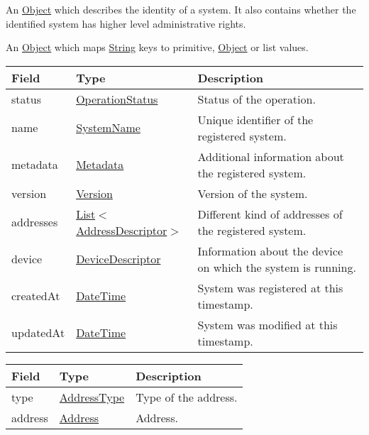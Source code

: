 \documentclass[a4paper]{arrowhead}
\newcommand{\pref}[1]{{\textcolor{ArrowheadGrey}{\hyperref[sec:model:primitives:#1]{#1}}}}
\begin{document}

An \pref{Object} which describes the identity of a system. It also contains whether the identified system has higher level administrative rights.


An \pref{Object} which maps \pref{String} keys to primitive, \pref{Object} or list values.

 
\begin{table}[ht!]
\begin{tabularx}{\textwidth}{| p{4.25cm} | p{4cm} | X |} \hline
\rowcolor{gray!33} Field & Type      & Description \\ \hline
status & \pref{OperationStatus} & Status of the operation. \\ \hline
name & \pref{SystemName} & Unique identifier of the registered system. \\ \hline
metadata & \hyperref[sec:model:Metadata]{Metadata} & Additional information about the registered system. \\ \hline
version & \pref{Version} & Version of the system. \\ \hline
addresses &  \pref{List}$<$\hyperref[sec:model:AddressDescriptor]{AddressDescriptor}$>$ & Different kind of addresses of the registered system.  \\ \hline
device & \hyperref[sec:model:DeviceDescriptor]{DeviceDescriptor} & Information about the device on which the system is running. \\ \hline
createdAt & \pref{DateTime} & System was registered at this timestamp. \\ \hline
updatedAt & \pref{DateTime} & System was modified at this timestamp. \\ \hline
\end{tabularx}
\end{table}


\begin{table}[ht!]
\begin{tabularx}{\textwidth}{| p{4.25cm} | p{3.5cm} | X |} \hline
\rowcolor{gray!33} Field & Type      & Description \\ \hline
type & \pref{AddressType} & Type of the address. \\ \hline
address & \pref{Address} & Address. \\ \hline
\end{tabularx}
\end{table}
\end{document}
